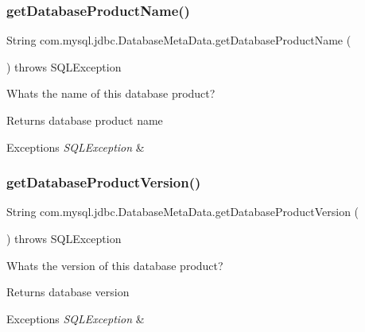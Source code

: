 \subsubsection{\texorpdfstring{get\+Database\+Product\+Name()}{getDatabaseProductName()}}
{\footnotesize\ttfamily String com.\+mysql.\+jdbc.\+Database\+Meta\+Data.\+get\+Database\+Product\+Name (\begin{DoxyParamCaption}{ }\end{DoxyParamCaption}) throws S\+Q\+L\+Exception}

What\textquotesingle{}s the name of this database product?

\begin{DoxyReturn}{Returns}
database product name 
\end{DoxyReturn}

\begin{DoxyExceptions}{Exceptions}
{\em S\+Q\+L\+Exception} & \\
\hline
\end{DoxyExceptions}
\mbox{\label{classcom_1_1mysql_1_1jdbc_1_1_database_meta_data_a7b81e97e134818164e79077b98836631}} 
\subsubsection{\texorpdfstring{get\+Database\+Product\+Version()}{getDatabaseProductVersion()}}
{\footnotesize\ttfamily String com.\+mysql.\+jdbc.\+Database\+Meta\+Data.\+get\+Database\+Product\+Version (\begin{DoxyParamCaption}{ }\end{DoxyParamCaption}) throws S\+Q\+L\+Exception}

What\textquotesingle{}s the version of this database product?

\begin{DoxyReturn}{Returns}
database version 
\end{DoxyReturn}

\begin{DoxyExceptions}{Exceptions}
{\em S\+Q\+L\+Exception} & \\
\hline
\end{DoxyExceptions}
\mbox{\label{classcom_1_1mysql_1_1jdbc_1_1_database_meta_data_ac945602242f39a14278fa4951d98eb64}} 
